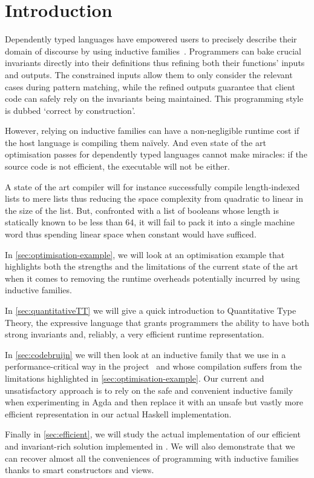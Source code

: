 
\section{Introduction}

Dependently typed languages have empowered users to precisely describe their domain
of discourse by using inductive families~\cite{DBLP:journals/fac/Dybjer94}.
%
Programmers can bake crucial invariants directly into their definitions thus refining
both their functions' inputs and outputs.
%
The constrained inputs allow them to only consider the relevant cases during pattern
matching, while the refined outputs guarantee that client code can safely rely on the
invariants being maintained.
%
This programming style is dubbed `correct by construction'.

However, relying on inductive families can have a non-negligible runtime cost if
the host language is compiling them naïvely. And even state of the art optimisation
passes for dependently typed languages cannot make miracles: if the source code is
not efficient, the executable will not be either.

A state of the art compiler will for instance successfully compile length-indexed
lists to mere lists thus reducing the space complexity from quadratic to linear
in the size of the list.
%
But, confronted with a list of booleans whose length is statically known to be
less than 64, it will fail to pack it into a single machine word thus spending
linear space when constant would have sufficed.

In \cref{sec:optimisation-example}, we will look at an optimisation example
that highlights both the strengths and the limitations of the current state
of the art when it comes to removing the runtime overheads potentially
incurred by using inductive families.

In \cref{sec:quantitativeTT} we will give a quick introduction to Quantitative
Type Theory, the expressive language that grants programmers the ability
to have both strong invariants and, reliably, a very efficient runtime
representation.

In \cref{sec:codebruijn} we will then look at an inductive family that we
use in a performance-critical way in the \typos{}
project~\cite{MANUAL:talk/types/Allais22}
and whose compilation suffers from the limitations highlighted in
\cref{sec:optimisation-example}.
%
Our current and unsatisfactory approach is to rely on the safe and convenient
inductive family when experimenting in Agda and then replace it with an unsafe
but vastly more efficient representation in our actual Haskell implementation.

Finally in \cref{sec:efficient}, we will study the actual implementation of
our efficient and invariant-rich solution implemented in \idris{}. We will
also demonstrate that we can recover almost all the conveniences of programming
with inductive families thanks to smart constructors and views.
